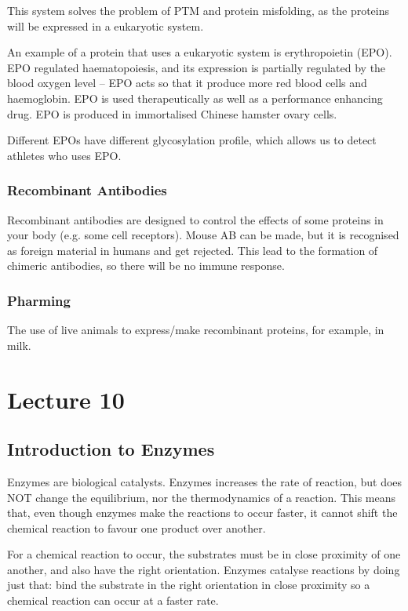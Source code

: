 \documentclass[a4paper, 12pt]{report}
\newcommand{\mychapter}[2]{
    \setcounter{chapter}{#1}
    \setcounter{section}{0}
    \chapter*{#2}
    \addcontentsline{toc}{chapter}{#2}
}
\begin{document}
This system solves the problem of PTM and protein misfolding, as the proteins will be expressed in a eukaryotic system.

An example of a protein that uses a eukaryotic system is erythropoietin (EPO).
EPO regulated haematopoiesis, and its expression is partially regulated by the blood oxygen level -- EPO acts so that it produce more red blood cells and haemoglobin.
EPO is used therapeutically as well as a performance enhancing drug.
EPO is produced in immortalised Chinese hamster ovary cells.

Different EPOs have different glycosylation profile, which allows us to detect athletes who uses EPO.

\subsection{Recombinant Antibodies}

Recombinant antibodies are designed to control the effects of some proteins in your body (e.g. some cell receptors).
Mouse AB can be made, but it is recognised as foreign material in humans and get rejected.
This lead to the formation of chimeric antibodies, so there will be no immune response.

\subsection{Pharming}

The use of live animals to express/make recombinant proteins, for example, in milk.

\mychapter{10}{Lecture 10}

\section{Introduction to Enzymes}

Enzymes are biological catalysts.
Enzymes increases the rate of reaction, but does NOT change the equilibrium, nor the thermodynamics of a reaction.
This means that, even though enzymes make the reactions to occur faster, it cannot shift the chemical reaction to favour one product over another.

For a chemical reaction to occur, the substrates must be in close proximity of one another, and also have the right orientation.
Enzymes catalyse reactions by doing just that: bind the substrate in the right orientation in close proximity so a chemical reaction can occur at a faster rate.
\end{document}
